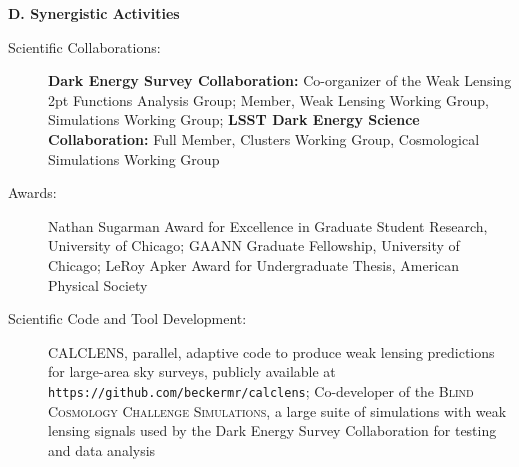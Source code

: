 \documentclass[10pt]{article}
\begin{document}

{\large \bf D. Synergistic Activities}
\begin{description}
\item[Scientific Collaborations:] {\bf Dark Energy Survey Collaboration:} Co-organizer of the Weak Lensing 2pt Functions Analysis Group; Member, 
Weak Lensing Working Group, Simulations Working Group; {\bf LSST Dark Energy Science Collaboration:} Full Member, Clusters Working Group, Cosmological Simulations Working Group
\item[Awards:] Nathan Sugarman Award for Excellence in Graduate Student Research, University of Chicago; GAANN Graduate Fellowship, University of Chicago; LeRoy Apker Award for Undergraduate Thesis, American Physical Society
\item[Scientific Code and Tool Development:] \textsc{CALCLENS}, parallel, adaptive code to produce weak lensing predictions for large-area sky surveys, publicly available at \verb+https://github.com/beckermr/calclens+; Co-developer of the \textsc{Blind Cosmology Challenge Simulations}, a large suite of simulations with weak lensing signals used by the Dark Energy Survey Collaboration for testing and data analysis
\end{description}

\end{document}
